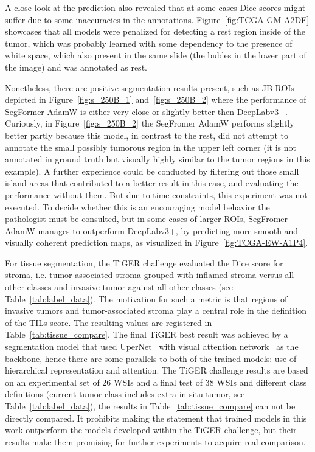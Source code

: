 A close look at the prediction also revealed that at some cases Dice scores might suffer due to some inaccuracies
in the annotations. Figure~\ref*{fig:TCGA-GM-A2DF} showcases that all models were
penalized for detecting a rest region inside of the tumor, which was probably learned
with some dependency to the presence of white space, which also present in the same slide
(the bubles in the lower part of the image) and was annotated as rest.

Nonetheless, there are positive segmentation results present, such as JB ROIs depicted in
Figure~\ref*{fig:s_250B_1} and~\ref*{fig:s_250B_2} where the performance of SegFormer AdamW
is either very close or slightly better then DeepLabv3+. 
Curiously, in Figure~\ref*{fig:s_250B_2} the SegFromer AdamW performs slightly better partly
because this model, in contrast to the rest, did not attempt to annotate the small possibly
tumorous region in the upper left corner (it is not annotated in ground
truth but visually highly similar to the tumor regions in this example).
A further experience could be conducted by filtering out those small island
areas that contributed to a better result in this case, and evaluating the performance
without them.
But due to time constraints, this experiment was not executed.
To decide whether this is an encouraging model behavior the pathologist must be consulted,
but in some cases of larger ROIs, SegFromer AdamW manages to outperform DeepLabv3+,
by predicting more smooth and visually coherent prediction maps, as visualized in
Figure~\ref*{fig:TCGA-EW-A1P4}.

For tissue segmentation, the TiGER challenge evaluated the Dice score for stroma,
i.e. tumor-associated stroma grouped with inflamed stroma versus all other classes
and invasive tumor against all other classes (see Table~\ref{tab:label_data}). 
The motivation for such a metric is that regions of invasive tumors and 
tumor-associated stroma play a central role in the definition of the TILs score.
The resulting values are registered in Table~\ref{tab:tissue_compare}. 
The final TiGER best result was achieved by a segmentation model that used
UperNet~\cite{xiao2018unified} with visual attention network~\cite{guo2022visual}
as the backbone, hence there are some parallels to both of the trained models:
use of hierarchical representation and attention.
The TiGER challenge results are based on an experimental set of 26 WSIs
and a final test of 38 WSIs and different class definitions (current tumor
class includes extra in-situ tumor, see Table~\ref{tab:label_data}),
the results in Table~\ref{tab:tissue_compare} can not be directly compared.
It prohibits making the statement that trained models in this work outperform the models
developed within the TiGER challenge, but their results make them promising for
further experiments to acquire real comparison.

